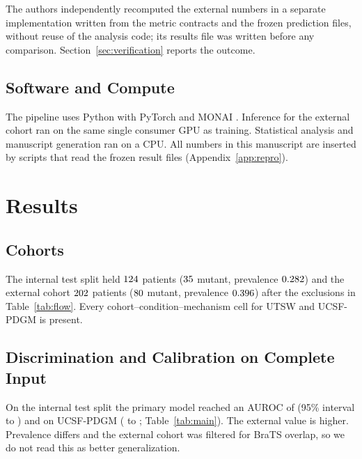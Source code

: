 \documentclass[journal]{IEEEtran}
\begin{document}
The authors independently recomputed the external numbers in a separate implementation written from the metric contracts and the frozen prediction files, without reuse of the analysis code; its results file was written before any comparison. Section~\ref{sec:verification} reports the outcome.

\subsection{Software and Compute}
The pipeline uses Python with PyTorch and MONAI \cite{cardoso2022monai}. Inference for the external cohort ran on the same single consumer GPU as training. Statistical analysis and manuscript generation ran on a CPU. All numbers in this manuscript are inserted by scripts that read the frozen result files (Appendix~\ref{app:repro}).

\section{Results}
\label{sec:results}

\subsection{Cohorts}
The internal test split held $124$ patients ($35$ mutant, prevalence $0.282$) and the external cohort $202$ patients ($80$ mutant, prevalence $0.396$) after the exclusions in Table~\ref{tab:flow}. Every cohort--condition--mechanism cell for UTSW and UCSF-PDGM is present.

\subsection{Discrimination and Calibration on Complete Input}
On the internal test split the primary model reached an AUROC of \numIntRTwoAuroc{} (95\% interval \numIntAurocLo{} to \numIntAurocHi{}) and on UCSF-PDGM \numExtRTwoAuroc{} (\numExtAurocLo{} to \numExtAurocHi{}; Table~\ref{tab:main}). The external value is higher. Prevalence differs and the external cohort was filtered for BraTS overlap, so we do not read this as better generalization.
\end{document}
